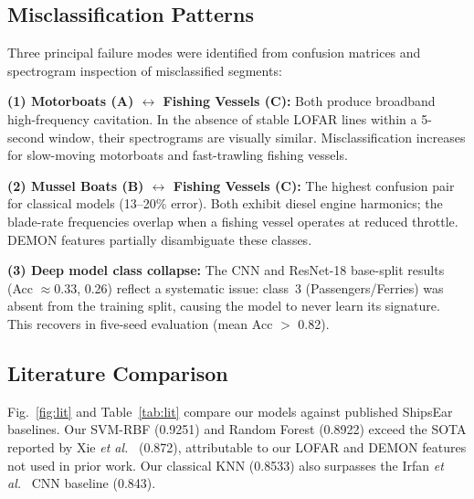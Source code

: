 \documentclass[conference]{IEEEtran}
\begin{document}
\subsection{Misclassification Patterns}

Three principal failure modes were identified from confusion matrices
and spectrogram inspection of misclassified segments:

\textbf{(1) Motorboats (A) $\leftrightarrow$ Fishing Vessels (C):}
Both produce broadband high-frequency cavitation. In the absence of
stable LOFAR lines within a 5-second window, their spectrograms are
visually similar. Misclassification increases for slow-moving motorboats
and fast-trawling fishing vessels.

\textbf{(2) Mussel Boats (B) $\leftrightarrow$ Fishing Vessels (C):}
The highest confusion pair for classical models (13--20\% error). Both
exhibit diesel engine harmonics; the blade-rate frequencies overlap when
a fishing vessel operates at reduced throttle. DEMON features partially
disambiguate these classes.

\textbf{(3) Deep model class collapse:}
The CNN and ResNet-18 base-split results (Acc $\approx$0.33, 0.26)
reflect a systematic issue: class~3 (Passengers/Ferries) was absent
from the training split, causing the model to never learn its signature.
This recovers in five-seed evaluation (mean Acc $>$ 0.82).

\subsection{Literature Comparison}

Fig.~\ref{fig:lit} and Table~\ref{tab:lit} compare our models against
published ShipsEar baselines. Our SVM-RBF (0.9251) and Random Forest
(0.8922) exceed the SOTA reported by Xie \textit{et al.}~\cite{xie2022}
(0.872), attributable to our LOFAR and DEMON features not used in
prior work. Our classical KNN (0.8533) also surpasses the Irfan
\textit{et al.}~\cite{irfan2021} CNN baseline (0.843).
\end{document}
